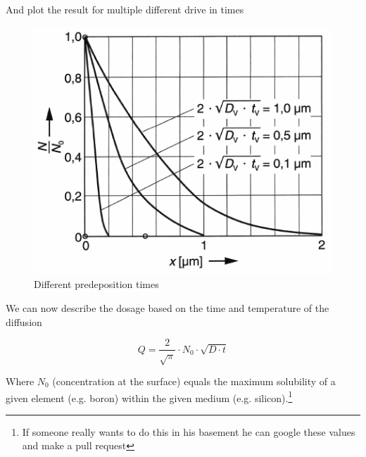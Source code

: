 And plot the result for multiple different drive in times
\begin{figure}[H]
	\centering
	\includegraphics[scale=0.5]{dopants_depth.png}
	\caption{Different predeposition times}
\end{figure}

We can now describe the dosage based on the time and temperature of the diffusion

\begin{equation}
Q=\frac{2}{\sqrt{\pi}} \cdot N_0 \cdot \sqrt{D \cdot t}
\end{equation}

Where $N_0$ (concentration at the surface) equals the maximum solubility of a given element (e.g. boron) within the given medium (e.g. silicon).\footnote{If someone really wants to do this in his basement he can google these values and make a pull request}

